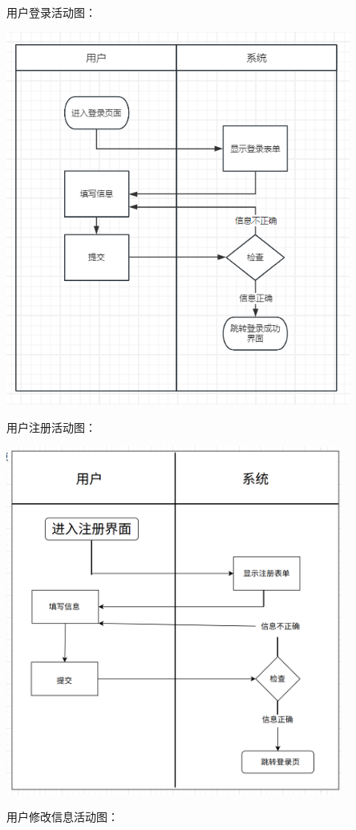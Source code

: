 \documentclass[]{article}
\let\oldincludegraphics\includegraphics
\renewcommand{\includegraphics}[2][]{%
  \begin{center}\oldincludegraphics[#1]{#2}\end{center}%
}
\begin{document}
用户登录活动图：

\includegraphics[width=4.45694in,height=4.83819in]{media/media/image1.png}

用户注册活动图：

\includegraphics[width=4.35278in,height=4.51458in]{media/media/image2.png}

用户修改信息活动图：
\end{document}
